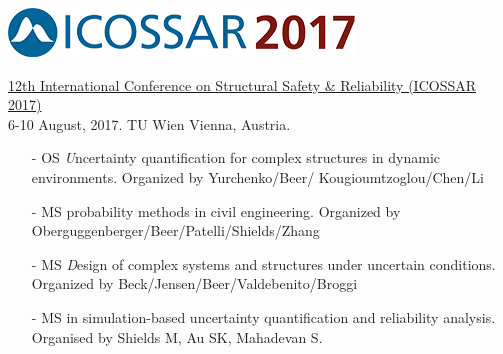 \documentclass[11pt]{article}%
\begin{document}
\begin{minipage}[t]{0.15\textwidth}
\vspace{1pt}
\includegraphics[width=1\linewidth]{symposia/logo-icossar.png}
\end{minipage}
\hspace{2pt}
\begin{minipage}[t]{0.79\textwidth}
\href{http://www.icossar2017.org/}{12th International Conference on Structural Safety & Reliability (ICOSSAR 2017)}
\\ 
6-10 August, 2017. TU Wien Vienna, Austria.
\begin{itemize}
    \item[-] OS {\textit Uncertainty quantification for complex structures in dynamic environments.} Organized by Yurchenko/Beer/ Kougioumtzoglou/Chen/Li
    \item[-] MS {\textitImprecise probability methods in civil engineering.} Organized by Oberguggenberger/Beer/Patelli/Shields/Zhang 
    \item[-] MS {\textit Design of complex systems and structures under uncertain conditions.} Organized by Beck/Jensen/Beer/Valdebenito/Broggi
    \item[-] MS {\textitAdvances in simulation-based uncertainty quantification and reliability analysis.} Organised by Shields M, Au SK, Mahadevan S.
\end{itemize}
\end{minipage}


\vspace{10pt}
\end{document}
